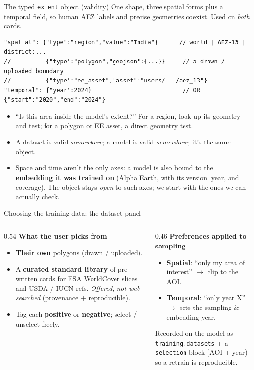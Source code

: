 \documentclass[aspectratio=169]{beamer}
\begin{document}
\begin{frame}[fragile]{The typed \texttt{extent} object (validity)}
One shape, three spatial forms plus a temporal field, so human AEZ labels and precise
geometries coexist. Used on \emph{both} cards.
\begin{lstlisting}[style=json]
"spatial": {"type":"region","value":"India"}      // world | AEZ-13 | district:...
//          {"type":"polygon","geojson":{...}}     // a drawn / uploaded boundary
//          {"type":"ee_asset","asset":"users/.../aez_13"}
"temporal": {"year":2024}                          // OR {"start":"2020","end":"2024"}
\end{lstlisting}
\begin{itemize}\footnotesize
  \item ``Is this area inside the model's extent?'' For a region, look up its geometry and
  test; for a polygon or EE asset, a direct geometry test.
  \item A dataset is valid \emph{somewhere}; a model is valid \emph{somewhere}; it's the same object.
  \item Space and time aren't the only axes: a model is also bound to the \textbf{embedding it
  was trained on} (Alpha Earth, with its version, year, and coverage). The object stays
  \emph{open} to such axes; we start with the ones we can actually check.
\end{itemize}
\end{frame}

\begin{frame}{Choosing the training data: the dataset panel}
\begin{columns}[T]
\begin{column}{0.54\textwidth}
\textbf{What the user picks from}
\begin{itemize}\small
  \item \textbf{Their own} polygons (drawn / uploaded).
  \item A \textbf{curated standard library} of pre-written cards for ESA WorldCover slices
  and USDA / IUCN refs. \emph{Offered, not web-searched} (provenance + reproducible).
  \item Tag each \textbf{positive} or \textbf{negative}; select / unselect freely.
\end{itemize}
\end{column}
\begin{column}{0.46\textwidth}
\textbf{Preferences applied to sampling}
\begin{itemize}\small
  \item \textbf{Spatial}: ``only my area of interest'' $\to$ clip to the AOI.
  \item \textbf{Temporal}: ``only year X'' $\to$ sets the sampling \& embedding year.
\end{itemize}
\vspace{0.3em}
{\footnotesize Recorded on the model as \texttt{training.datasets} + a \texttt{selection}
block (AOI + year) so a retrain is reproducible.}
\end{column}
\end{columns}
\end{frame}
\end{document}
